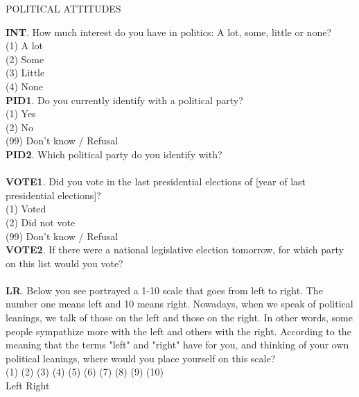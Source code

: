 \documentclass[11pt, ngerman,english,a4]{article}
\begin{document}
\vspace{0.5cm}

\begin{center}
    POLITICAL ATTITUDES \\
\end{center}

\noindent \textbf{INT}. How much interest do you have in politics: A lot, some, little or none? \\
(1) A lot \\
(2) Some \\
(3) Little \\
(4) None \\

\noindent \textbf{PID1}. Do you currently identify with a political party? \\
(1) Yes \\
(2) No \\
(99) Don't know / Refusal \\

\noindent \textbf{PID2}. Which political party do you identify with? \\
 \\

\noindent \textbf{VOTE1}. Did you vote in the last presidential elections of [year of last presidential elections]? \\
(1) Voted \\
(2) Did not vote \\
(99) Don't know / Refusal \\

\noindent \textbf{VOTE2}. If there were a national legislative election tomorrow, for which party on this list would you vote? \\  \\

\noindent \textbf{LR}. Below you see portrayed a 1-10 scale that goes from left to right. The number one means left and 10 means right. Nowadays, when we speak of political leanings, we talk of those on the left and those on the right. In other words, some people sympathize more with the left and others with the right. According to the meaning that the terms "left" and "right" have for you, and thinking of your own
political leanings, where would you place yourself on this scale? \\

\noindent (1) \hspace{0.1cm} (2) \hspace{0.1cm} (3) \hspace{0.1cm} (4) \hspace{0.1cm} (5) \hspace{0.1cm} (6) \hspace{0.1cm} (7) \hspace{0.1cm} (8) \hspace{0.1cm} (9) \hspace{0.1cm} (10) \\
Left \hspace{6cm} Right \\
\end{document}
